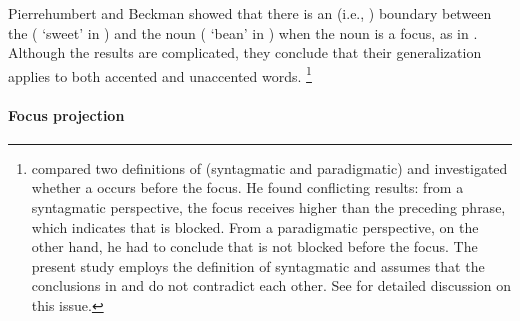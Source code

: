 Pierrehumbert and Beckman showed that
there is an  (i.e., ) boundary
between the  ( `sweet' in \Last[A]) and the noun ( `bean' in \Last[b])
when the noun is a focus, as in \Last.
Although the results are complicated,
they conclude that their generalization applies to both accented and unaccented words.%
 \footnote{
  compared two definitions of  (syntagmatic and paradigmatic) and investigated whether a  occurs before the focus.
 He found conflicting results: from a syntagmatic perspective, the focus receives higher  than the preceding phrase, which indicates that  is blocked.
 From a paradigmatic perspective, on the other hand, he had to conclude that  is not blocked before the focus.
 The present study employs the definition of syntagmatic 
 and assumes that the conclusions in  and  do not contradict each other.
 See  for detailed discussion on this issue.
 }



\paragraph{Focus projection}

